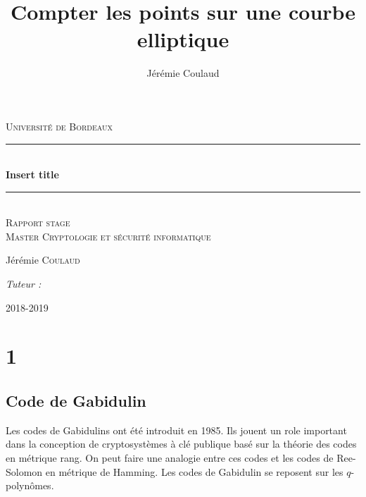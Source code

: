 \documentclass[12pt]{article}
\title{Compter les points sur une courbe elliptique}
\author{Jérémie Coulaud}
\newcommand{\HRule}{\rule{\linewidth}{0.5mm}}
\begin{document}
\newtheorem{prop}{Proposition}
\newtheorem{defi}{Définition}
\newtheorem{thm}{Théorème}
\begin{titlepage}

\begin{center}
\textsc{\LARGE Université de Bordeaux} \\[2.0cm]

\vspace{3cm}
    \HRule \\[0.4cm]
    { \huge \bfseries Insert title\\[0.4cm] }
 \HRule \\[2cm]

 \textsc{\large Rapport stage} \\[1.5cm]
 \textsc{\large Master Cryptologie et sécurité informatique} \\[1.5cm]
 \vspace{4cm}
    \begin{minipage}{0.4\textwidth}
      \begin{flushleft} \large
        Jérémie \textsc{Coulaud}\\
      \end{flushleft}
    \end{minipage}
    \begin{minipage}{0.4\textwidth}
      \begin{flushright} \large
        \emph{Tuteur :}  \textsc{}\\
      \end{flushright}
    \end{minipage}

 \vfill
    {\large 2018-2019}
\end{center}
\end{titlepage}
\newpage
\tableofcontents
\newpage
\section{1}


\subsection{Code de Gabidulin}
Les codes de Gabidulins ont été introduit en 1985. Ils jouent un role important dans la conception de cryptosystèmes à clé publique basé sur la théorie des codes en métrique rang. On peut faire une analogie entre ces codes et les codes de Ree-Solomon en métrique de Hamming. Les codes de Gabidulin se reposent sur les $q$-polynômes.
\end{document}
